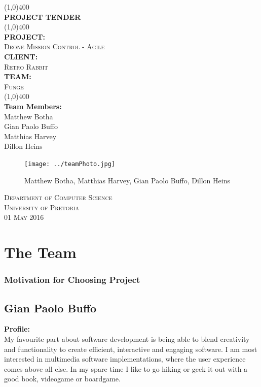 \documentclass{article}
\begin{document}
\begin{titlepage}
	\begin{center}
		\line(1,0){400}\\
		[6mm]
		\huge{\bfseries PROJECT TENDER}\\
		[2mm]
		\line(1,0){400}\\
		[5mm]
		\large\textbf{PROJECT:}\\\textsc{Drone Mission Control - Agile}\\
		[3mm]
		\large\textbf{CLIENT:}\\\textsc{Retro Rabbit}\\
		[3mm]
		\large \textbf{TEAM:}\\\textsc{Funge}\\
		\line(1,0){400}\\
		[5mm]
		\large \textbf{Team Members:}\\
		[3mm]
		\large Matthew Botha\\
		\large Gian Paolo Buffo\\
		\large Matthias Harvey\\
        \large Dillon Heins\\[3mm]
		\begin{figure}[H]
			\centering
			\texttt{[image: ../teamPhoto.jpg]}
			\caption{Matthew Botha, Matthias Harvey, Gian Paolo Buffo, Dillon Heins}
		\end{figure}
    \end{center}

	\vspace{7mm}

    \begin{flushright}
        \textsc{\large Department of Computer Science\\
        University of Pretoria\\
        01 May 2016\\}
    \end{flushright}
\end{titlepage}

\section{The Team}

\subsubsection{Motivation for Choosing Project}

\cleardoublepage	

\subsection{Gian Paolo Buffo}
\textbf{Profile:}\\
My favourite part about software development is being able to blend creativity and functionality to create efficient, interactive and engaging software. I am most interested in multimedia software implementations, where the user experience comes above all else. In my spare time I like to go hiking or geek it out with a good book, videogame or boardgame.  
\end{document}
